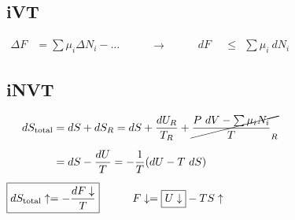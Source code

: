 \documentclass[12pt]{article}
\begin{document}
\vspace{5pt}
\subsection{iVT}
\(\begin{aligned}
    \Delta F &= \sum \mu_i \Delta N_i - \dots
\end{aligned}
\hspace{1cm} \rightarrow \hspace{1cm} \boxed{ \begin{aligned}
    dF \ \ &\leq \ \ \sum \mu_i\ dN_i
\end{aligned} } \)

\vspace{5pt}
\subsection{iNVT}
\(\begin{aligned}
    dS_\text{total} &= dS + dS_R = dS + \frac{dU_R}{T_R} + \cancel{\frac{P\ dV - \sum \mu_i N_i}{T}_R}\\[5pt]
    &= dS - \frac{dU}{T} = -\frac{1}{T} (dU - T\ dS)\\[5pt]
    \Aboxed{ dS_\text{total}\uparrow &= - \frac{dF\downarrow}{T} }
    \indent\indent F\downarrow = \boxed{U\downarrow} - TS\uparrow
\end{aligned}\)

\vspace{5pt}
\end{document}
